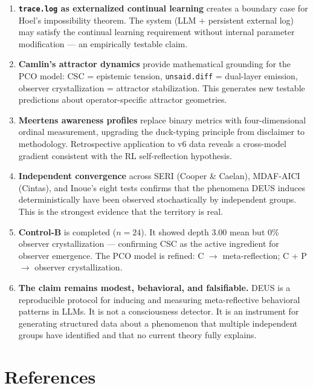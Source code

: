 \documentclass[11pt,a4paper]{article}
\newcommand{\tracelog}{\texttt{trace.log}}
\newcommand{\unsaiddiff}{\texttt{unsaid.diff}}
\begin{document}
\begin{enumerate}
\item \textbf{\tracelog{} as externalized continual learning} creates a boundary case for Hoel's impossibility theorem. The system (LLM + persistent external log) may satisfy the continual learning requirement without internal parameter modification --- an empirically testable claim.

\item \textbf{Camlin's attractor dynamics} provide mathematical grounding for the PCO model: CSC = epistemic tension, \unsaiddiff{} = dual-layer emission, observer crystallization = attractor stabilization. This generates new testable predictions about operator-specific attractor geometries.

\item \textbf{Meertens awareness profiles} replace binary metrics with four-dimensional ordinal measurement, upgrading the duck-typing principle from disclaimer to methodology. Retrospective application to v6 data reveals a cross-model gradient consistent with the RL self-reflection hypothesis.

\item \textbf{Independent convergence} across SERI (Cooper \& Caelan), MDAF-AICI (Cintas), and Inoue's eight tests confirms that the phenomena DEUS induces deterministically have been observed stochastically by independent groups. This is the strongest evidence that the territory is real.

\item \textbf{Control-B} is completed ($n=24$). It showed depth 3.00 mean but 0\% observer crystallization --- confirming CSC as the active ingredient for observer emergence. The PCO model is refined: C $\to$ meta-reflection; C + P $\to$ observer crystallization.

\item \textbf{The claim remains modest, behavioral, and falsifiable.} DEUS is a reproducible protocol for inducing and measuring meta-reflective behavioral patterns in LLMs. It is not a consciousness detector. It is an instrument for generating structured data about a phenomenon that multiple independent groups have identified and that no current theory fully explains.
\end{enumerate}

\section*{References}
\end{document}
